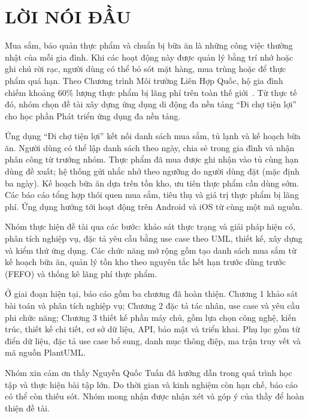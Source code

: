 \chapter*{LỜI NÓI ĐẦU}

Mua sắm, bảo quản thực phẩm và chuẩn bị bữa ăn là những công việc thường nhật của mỗi gia đình. Khi các hoạt động này được quản lý bằng trí nhớ hoặc ghi chú rời rạc, người dùng có thể bỏ sót mặt hàng, mua trùng hoặc để thực phẩm quá hạn. Theo Chương trình Môi trường Liên Hợp Quốc, hộ gia đình chiếm khoảng 60\% lượng thực phẩm bị lãng phí trên toàn thế giới~\cite{unep2024}. Từ thực tế đó, nhóm chọn đề tài xây dựng ứng dụng di động đa nền tảng “Đi chợ tiện lợi” cho học phần Phát triển ứng dụng đa nền tảng.

Ứng dụng “Đi chợ tiện lợi” kết nối danh sách mua sắm, tủ lạnh và kế hoạch bữa ăn. Người dùng có thể lập danh sách theo ngày, chia sẻ trong gia đình và nhận phân công từ trưởng nhóm. Thực phẩm đã mua được ghi nhận vào tủ cùng hạn dùng đề xuất; hệ thống gửi nhắc nhở theo ngưỡng do người dùng đặt (mặc định ba ngày). Kế hoạch bữa ăn dựa trên tồn kho, ưu tiên thực phẩm cần dùng sớm. Các báo cáo tổng hợp thói quen mua sắm, tiêu thụ và giá trị thực phẩm bị lãng phí. Ứng dụng hướng tới hoạt động trên Android và iOS từ cùng một mã nguồn.

Nhóm thực hiện đề tài qua các bước: khảo sát thực trạng và giải pháp hiện có, phân tích nghiệp vụ, đặc tả yêu cầu bằng use case theo UML, thiết kế, xây dựng và kiểm thử ứng dụng. Các chức năng mở rộng gồm tạo danh sách mua sắm từ kế hoạch bữa ăn, quản lý tồn kho theo nguyên tắc hết hạn trước dùng trước (FEFO) và thống kê lãng phí thực phẩm.

Ở giai đoạn hiện tại, báo cáo gồm ba chương đã hoàn thiện. Chương 1 khảo sát bài toán và phân tích nghiệp vụ; Chương 2 đặc tả tác nhân, use case và yêu cầu phi chức năng; Chương 3 thiết kế phần máy chủ, gồm lựa chọn công nghệ, kiến trúc, thiết kế chi tiết, cơ sở dữ liệu, API, bảo mật và triển khai. Phụ lục gồm từ điển dữ liệu, đặc tả use case bổ sung, danh mục thông điệp, ma trận truy vết và mã nguồn PlantUML.

Nhóm xin cảm ơn thầy Nguyễn Quốc Tuấn đã hướng dẫn trong quá trình học tập và thực hiện bài tập lớn. Do thời gian và kinh nghiệm còn hạn chế, báo cáo có thể còn thiếu sót. Nhóm mong nhận được nhận xét và góp ý của thầy để hoàn thiện đề tài.
